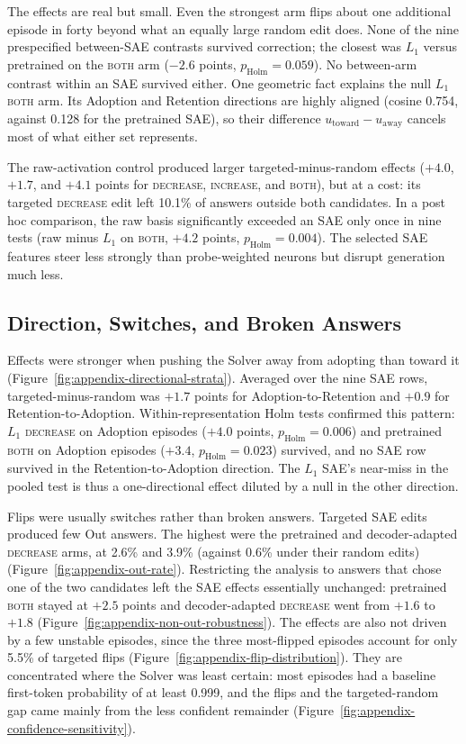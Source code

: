 The effects are real but small. Even the strongest arm flips about one
additional episode in forty beyond what an equally large random edit does.
None of the nine prespecified between-SAE contrasts survived correction; the
closest was $L_1$ versus pretrained on the \textsc{both} arm ($-2.6$ points,
$p_{\mathrm{Holm}}=0.059$). No between-arm contrast within an SAE survived
either. One geometric fact explains the null $L_1$ \textsc{both} arm. Its
Adoption and Retention directions are highly aligned (cosine 0.754, against
0.128 for the pretrained SAE), so their difference
$u_{\mathrm{toward}}-u_{\mathrm{away}}$ cancels most of what either set
represents.

The raw-activation control produced larger targeted-minus-random effects
($+4.0$, $+1.7$, and $+4.1$ points for \textsc{decrease}, \textsc{increase}, and
\textsc{both}), but at a cost: its targeted \textsc{decrease} edit left 10.1\%
of answers outside both candidates. In a post hoc comparison, the raw basis
significantly exceeded an SAE only once in nine tests (raw minus $L_1$ on
\textsc{both}, $+4.2$ points, $p_{\mathrm{Holm}}=0.004$). The selected SAE
features steer less strongly than probe-weighted neurons but disrupt
generation much less.

\subsection{Direction, Switches, and Broken Answers}

Effects were stronger when pushing the Solver away from adopting than toward
it (Figure~\ref{fig:appendix-directional-strata}). Averaged over the nine SAE
rows, targeted-minus-random was $+1.7$ points for Adoption-to-Retention and
$+0.9$ for Retention-to-Adoption. Within-representation Holm tests confirmed
this pattern: $L_1$ \textsc{decrease} on Adoption episodes ($+4.0$ points,
$p_{\mathrm{Holm}}=0.006$) and pretrained \textsc{both} on Adoption episodes
($+3.4$, $p_{\mathrm{Holm}}=0.023$) survived, and no SAE row survived in the
Retention-to-Adoption direction. The $L_1$ SAE's near-miss in the pooled
test is thus a one-directional effect diluted by a null in the other
direction.

Flips were usually switches rather than broken answers. Targeted SAE edits
produced few Out answers. The highest were the pretrained and decoder-adapted
\textsc{decrease} arms, at 2.6\% and 3.9\% (against 0.6\% under their random
edits) (Figure~\ref{fig:appendix-out-rate}). Restricting the analysis to
answers that chose one of the two candidates left the SAE effects essentially
unchanged: pretrained \textsc{both} stayed at $+2.5$ points and decoder-adapted
\textsc{decrease} went from $+1.6$ to $+1.8$
(Figure~\ref{fig:appendix-non-out-robustness}). The effects are also not
driven by a few unstable episodes, since the three most-flipped episodes
account for only 5.5\% of targeted flips
(Figure~\ref{fig:appendix-flip-distribution}). They are concentrated where the
Solver was least certain: most episodes had a baseline first-token
probability of at least 0.999, and the flips and the targeted-random gap came
mainly from the less confident remainder
(Figure~\ref{fig:appendix-confidence-sensitivity}).

